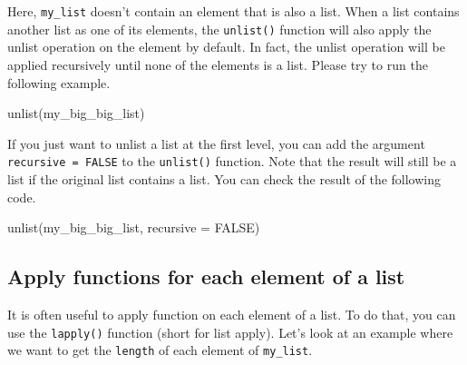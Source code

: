 \documentclass[
]{book}
\newenvironment{Shaded}{\begin{snugshade}}{\end{snugshade}}
\newcommand{\AttributeTok}[1]{\textcolor[rgb]{0.77,0.63,0.00}{#1}}
\newcommand{\CommentTok}[1]{\textcolor[rgb]{0.56,0.35,0.01}{\textit{#1}}}
\newcommand{\ConstantTok}[1]{\textcolor[rgb]{0.00,0.00,0.00}{#1}}
\newcommand{\FunctionTok}[1]{\textcolor[rgb]{0.00,0.00,0.00}{#1}}
\newcommand{\NormalTok}[1]{#1}
\begin{document}
Here, \texttt{my\_list} doesn't contain an element that is also a list. When a list contains another list as one of its elements, the \texttt{unlist()} function will also apply the unlist operation on the element by default. In fact, the unlist operation will be applied recursively until none of the elements is a list. Please try to run the following example.

\begin{Shaded}
\begin{Highlighting}[]
\FunctionTok{unlist}\NormalTok{(my\_big\_big\_list)}
\end{Highlighting}
\end{Shaded}

If you just want to unlist a list at the first level, you can add the argument \texttt{recursive\ =\ FALSE} to the \texttt{unlist()} function. Note that the result will still be a list if the original list contains a list. You can check the result of the following code.

\begin{Shaded}
\begin{Highlighting}[]
\FunctionTok{unlist}\NormalTok{(my\_big\_big\_list, }\AttributeTok{recursive =} \ConstantTok{FALSE}\NormalTok{)}
\end{Highlighting}
\end{Shaded}

\hypertarget{apply-functions-for-each-element-of-a-list}{%
\subsection{Apply functions for each element of a list}\label{apply-functions-for-each-element-of-a-list}}

It is often useful to apply function on each element of a list. To do that, you can use the \texttt{lapply()} function (short for list apply). Let's look at an example where we want to get the \texttt{length} of each element of \texttt{my\_list}.

\begin{Shaded}
\end{Shaded}
\end{document}
